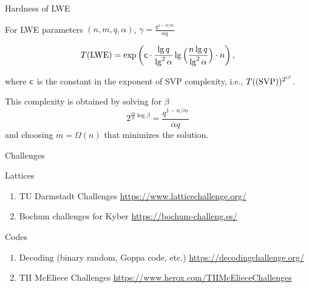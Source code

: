 \documentclass[usenames,dvipsnames, 9pt, aspectratio=169]{beamer}
\begin{document}
\begin{frame}{Hardness of LWE}
	\LARGE
	For LWE parameters $(n, m, q, \alpha)$, $\gamma = \frac{q^{1-n/m}}{\alpha q}$
	{
		
		{\color{Orange}
			\[
			T(\text{LWE}) = \exp\left(\mathsf{c} \cdot  \frac{\lg q}{\lg^2 \alpha} \lg\Big( \frac{n \lg q}{\lg^2 \alpha} \Big)  \cdot n\right),
			\]
		}
	}

	where $\mathsf{c}$ is the constant in the exponent of SVP complexity, i.e., $T(\text{(SVP)})^{2^{\mathsf{c} \beta}}$.
	
	This complexity is obtained by solving for $\beta$
	\[
	2^{ \tfrac{m}{\beta} \log \beta} = \frac{q^{1-n/m}}{\alpha q}
	\]
	and choosing $m = \Omega(n)$ that minimizes the solution.
\end{frame}

\begin{frame}{Challenges}
\Large
\begin{center}
	\LARGE \color{Orange} Lattices
\end{center}
\begin{enumerate}
	\itemsep 7pt
	\item TU Darmstadt Challenges \url{https://www.latticechallenge.org/}
	\item Bochum challenges for Kyber \url{https://bochum-challeng.es/}
\end{enumerate}

\begin{center}
	\LARGE \color{Orange} Codes
\end{center}
\begin{enumerate}
	\itemsep 7pt
	\item Decoding (binary random, Goppa code, etc.) \url{https://decodingchallenge.org/}
	\item TII McEliece Challenges \url{https://www.herox.com/TIIMcElieceChallenges}
\end{enumerate}
\end{frame}
\end{document}
